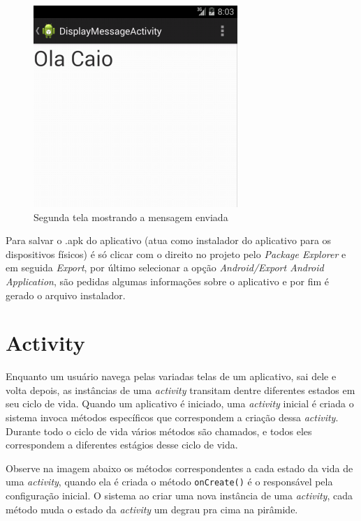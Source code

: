 \documentclass[a4paper,12pt,brazil,oneside]{book}
\begin{document}
\begin{figure}[H]
  \centering
  \includegraphics[width=.4\textwidth]{figuras/firstapp/firstapp11.png}
  \caption{Segunda tela mostrando a mensagem enviada}
  \label{fig:firstapp11}
\end{figure}

Para salvar o .apk do aplicativo (atua como instalador do aplicativo para os dispositivos físicos) é só clicar com o direito no projeto pelo \emph{Package Explorer} e em seguida \emph{Export}, por último selecionar a opção \emph{Android/Export Android Application}, são pedidas algumas informações sobre o aplicativo e por fim é gerado o arquivo instalador.


\section{Activity}
Enquanto um usuário navega pelas variadas telas de um aplicativo, sai dele e volta depois, as instâncias de uma \emph{activity} transitam dentre diferentes estados em seu ciclo de vida. Quando um aplicativo é iniciado, uma \emph{activity} inicial é criada o sistema invoca métodos específicos que correspondem a criação dessa \emph{activity}. Durante todo o ciclo de vida vários métodos são chamados, e todos eles correspondem a diferentes estágios desse ciclo de vida. 

Observe na imagem abaixo os métodos correspondentes a cada estado da vida de uma \emph{activity}, quando ela é criada o método \texttt{onCreate()} é o responsável pela configuração inicial. O sistema ao criar uma nova instância de uma \emph{activity}, cada método muda o estado da \emph{activity} um degrau pra cima na pirâmide. 
\end{document}
